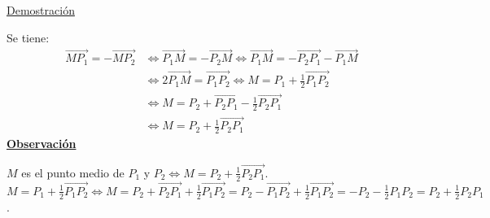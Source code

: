 \documentclass[12pt, a4paper, ones, notitlepage, openany,titlepage]{article}
\newcommand{\demostracion}{\noindent\underline{Demostración}}
\newcommand{\observacion}{\noindent\underline{\textbf{Observación}}}
\begin{document}
\demostracion

\noindent Se tiene:
$$
\begin{aligned}
\overrightarrow{M P_{1}}=-\overrightarrow{M P_{2}} & \Longleftrightarrow \overrightarrow{P_{1} M}=-\overrightarrow{P_{2} M} \Longleftrightarrow \overrightarrow{P_{1} M}=-\overrightarrow{P_{2} P_{1}}-\overrightarrow{P_{1} M} \\
& \Longleftrightarrow 2 \overrightarrow{P_{1} M}=\overrightarrow{P_{1} P_{2}} \Longleftrightarrow M=P_{1}+\frac{1}{2} \overrightarrow{P_{1} P_{2}} \\
& \Longleftrightarrow M=P_{2}+\overrightarrow{P_{2} P_{1}}-\frac{1}{2} \overrightarrow{P_{2} P_{1}} \\
& \Longleftrightarrow M=P_{2}+\frac{1}{2} \overrightarrow{P_{2} P_{1}}
\end{aligned}
$$
\observacion

$M$ es el punto medio de $P_1$ y $P_2 \Longleftrightarrow M = P_2 + \frac{1}{2} \overrightarrow{P_2 P_1}$. $M = P_1 + \frac{1}{2} \overrightarrow{P_1 P_2} \Longleftrightarrow M = P_2 + \overrightarrow{P_2 P_1} + \frac{1}{2} \overrightarrow{P_1 P_2} = P_2 - \overrightarrow{P_1 P_2} + \frac{1}{2} \overrightarrow{P_1 P_2} = -P_2 - \frac{1}{2} P_1 P_2 = P_2 + \frac{1}{2} P_2 P_1$.
\end{document}
